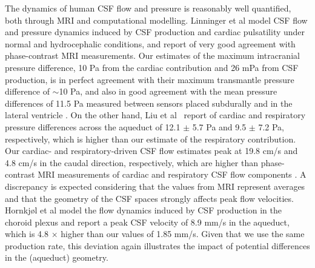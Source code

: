 \documentclass[fleqn,10pt]{wlscirep}
\begin{document}

The dynamics of human CSF flow and pressure is reasonably well quantified, both through MRI and computational modelling. Linninger et al \cite{linninger2007cerebrospinal} model CSF flow and pressure dynamics induced by CSF production and cardiac pulsatility under normal and hydrocephalic conditions, and report of very good agreement with phase-contrast MRI measurements. Our estimates of the maximum intracranial pressure difference, 10 Pa from the cardiac contribution and 26 mPa from CSF production, is in perfect agreement with their maximum transmantle pressure difference of $\sim$10 Pa, and also in good agreement with the mean pressure differences of 11.5 Pa measured between sensors placed subdurally and in the lateral ventricle \cite{vinje2019respiratory}. On the other hand, Liu et al~\cite{liu2025transmantle} report of cardiac and respiratory pressure differences across the aqueduct of 12.1 $\pm$ 5.7 Pa and 9.5 $\pm$ 7.2 Pa, respectively, which is higher than our estimate of the respiratory contribution. Our cardiac- and respiratory-driven CSF flow estimates peak at 19.8 cm/s and 4.8 cm/s in the caudal direction, respectively, which are higher than phase-contrast MRI measurements of cardiac and respiratory CSF flow components \cite{takizawa2017characterization, yildiz2017quantifying}. A discrepancy is expected considering that the values from MRI represent averages \cite{yildiz2017quantifying} and that the geometry of the CSF spaces strongly affects peak flow velocities\cite{vinje2019respiratory}. Hornkjøl et al \cite{hornkjol2022csf} model the flow dynamics induced by CSF production in the choroid plexus and report a peak CSF velocity of 8.9 mm/s in the aqueduct, which is 4.8 $\times$ higher than our values of 1.85 mm/s. Given that we use the same production rate, this deviation again illustrates the impact of potential differences in the (aqueduct) geometry.

\end{document}
